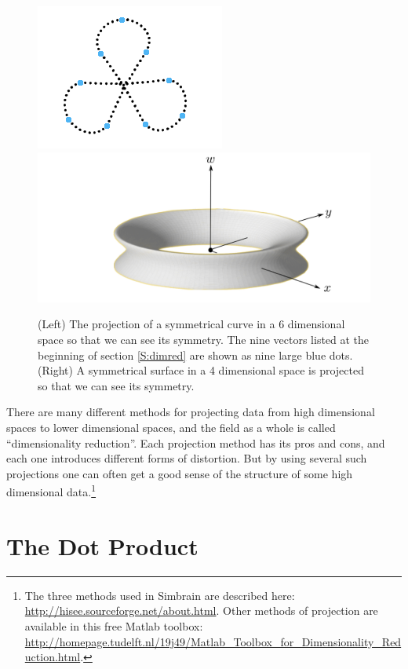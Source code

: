 \begin{figure}[h]
\centering
\includegraphics[scale=2.7]{./images/Sammon3.png}
\includegraphics[scale=0.22]{./images/torus.png}
\caption[Scott Hotton.]{(Left) The projection of a symmetrical curve in a 6 dimensional space 
so that we can see its symmetry. The nine vectors listed at the beginning of 
section \ref{S:dimred} are shown as nine large blue dots. (Right) A 
symmetrical surface in a 4 dimensional space is projected so that we can see 
its symmetry.}
\label{F:projection}
\end{figure}

There are many different methods for projecting data from high dimensional spaces to lower dimensional spaces, and the field as a whole is called ``dimensionality reduction''. Each projection method has its pros and cons, and each one introduces different forms of distortion. But by using several such projections one can often get a good sense of the structure of some high dimensional data.\footnote{The three methods used in Simbrain are described here: \url{http://hisee.sourceforge.net/about.html}. Other methods of projection are available in this free Matlab toolbox: \url{http://homepage.tudelft.nl/19j49/Matlab_Toolbox_for_Dimensionality_Reduction.html}.}

\section{The Dot Product}\label{dotProduct}

